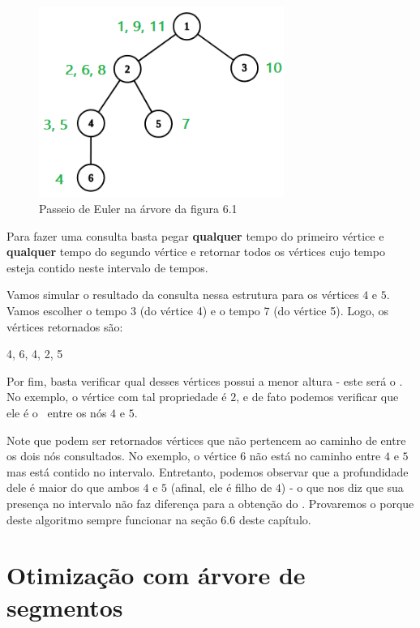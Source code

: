 \begin{figure}[htb]
\begin{center}
\includegraphics[width=8cm]{images/graph_euler_numbered.png}
\end{center}
\caption{\label{fig:arvore-euler2}Passeio de Euler na árvore da figura 6.1}
\end{figure}

Para fazer uma consulta basta pegar \textbf{qualquer} tempo do primeiro vértice e \textbf{qualquer} tempo do segundo vértice e retornar todos os vértices cujo tempo esteja contido neste intervalo de tempos.

Vamos simular o resultado da consulta nessa estrutura para os vértices $4$ e $5$. Vamos escolher o tempo 3 (do vértice 4) e o tempo 7 (do vértice 5). Logo, os vértices retornados são:



\begin{center}
    4, 6, 4, 2, 5    
\end{center}

Por fim, basta verificar qual desses vértices possui a menor altura - este será o \LCA. No exemplo, o vértice com tal propriedade é $2$, e de fato podemos verificar que ele é o \LCA\ entre os nós $4$ e $5$.

Note que podem ser retornados vértices que não pertencem ao caminho de entre os dois nós consultados. No exemplo, o vértice $6$ não está no caminho entre $4$ e $5$ mas está contido no intervalo. Entretanto, podemos observar que a profundidade dele é maior do que ambos $4$ e $5$ (afinal, ele é filho de $4$) - o que nos diz que sua presença no intervalo não faz diferença para a obtenção do \LCA. Provaremos o porque deste algoritmo sempre funcionar na seção 6.6 deste capítulo.

\section{Otimização com árvore de segmentos}

